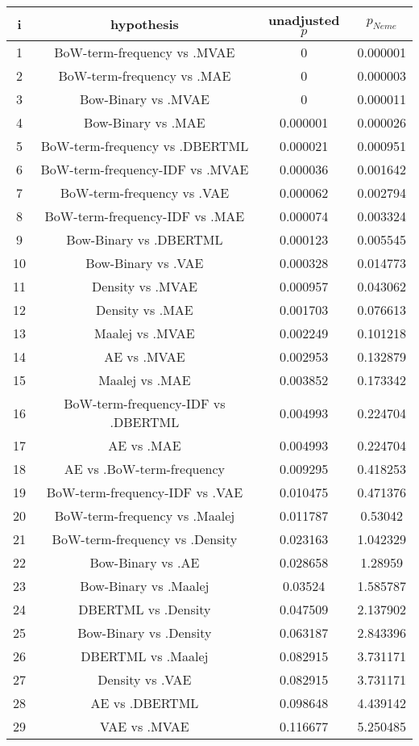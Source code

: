 \documentclass[a4paper,10pt]{article}
\begin{document}
\begin{landscape}
\begin{table}[!htp]
\centering\scriptsize
\begin{tabular}{cccc}
i&hypothesis&unadjusted $p$&$p_{Neme}$\\
\hline1&BoW-term-frequency vs .MVAE&0&0.000001\\
2&BoW-term-frequency vs .MAE&0&0.000003\\
3&Bow-Binary vs .MVAE&0&0.000011\\
4&Bow-Binary vs .MAE&0.000001&0.000026\\
5&BoW-term-frequency vs .DBERTML&0.000021&0.000951\\
6&BoW-term-frequency-IDF vs .MVAE&0.000036&0.001642\\
7&BoW-term-frequency vs .VAE&0.000062&0.002794\\
8&BoW-term-frequency-IDF vs .MAE&0.000074&0.003324\\
9&Bow-Binary vs .DBERTML&0.000123&0.005545\\
10&Bow-Binary vs .VAE&0.000328&0.014773\\
11&Density vs .MVAE&0.000957&0.043062\\
12&Density vs .MAE&0.001703&0.076613\\
13&Maalej vs .MVAE&0.002249&0.101218\\
14&AE vs .MVAE&0.002953&0.132879\\
15&Maalej vs .MAE&0.003852&0.173342\\
16&BoW-term-frequency-IDF vs .DBERTML&0.004993&0.224704\\
17&AE vs .MAE&0.004993&0.224704\\
18&AE vs .BoW-term-frequency&0.009295&0.418253\\
19&BoW-term-frequency-IDF vs .VAE&0.010475&0.471376\\
20&BoW-term-frequency vs .Maalej&0.011787&0.53042\\
21&BoW-term-frequency vs .Density&0.023163&1.042329\\
22&Bow-Binary vs .AE&0.028658&1.28959\\
23&Bow-Binary vs .Maalej&0.03524&1.585787\\
24&DBERTML vs .Density&0.047509&2.137902\\
25&Bow-Binary vs .Density&0.063187&2.843396\\
26&DBERTML vs .Maalej&0.082915&3.731171\\
27&Density vs .VAE&0.082915&3.731171\\
28&AE vs .DBERTML&0.098648&4.439142\\
29&VAE vs .MVAE&0.116677&5.250485\\

\end{tabular}
\end{table}
\end{landscape}
\end{document}
